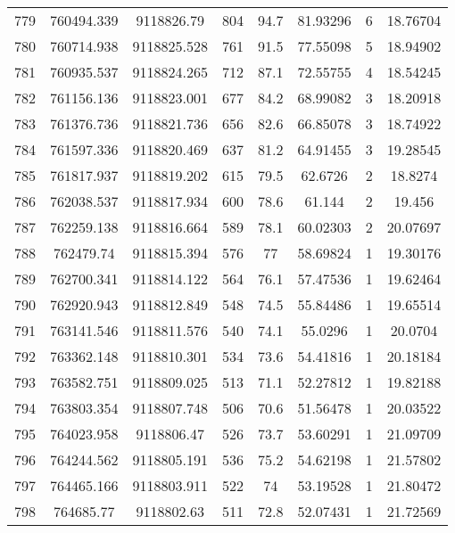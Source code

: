\begin{longtable}{cccccccc}
779  & 760494.339      & 9118826.79       & 804     & 94.7  & 81.93296 & 6  & 18.76704 \\
780  & 760714.938      & 9118825.528      & 761     & 91.5  & 77.55098 & 5  & 18.94902 \\
781  & 760935.537      & 9118824.265      & 712     & 87.1  & 72.55755 & 4  & 18.54245 \\
782  & 761156.136      & 9118823.001      & 677     & 84.2  & 68.99082 & 3  & 18.20918 \\
783  & 761376.736      & 9118821.736      & 656     & 82.6  & 66.85078 & 3  & 18.74922 \\
784  & 761597.336      & 9118820.469      & 637     & 81.2  & 64.91455 & 3  & 19.28545 \\
785  & 761817.937      & 9118819.202      & 615     & 79.5  & 62.6726  & 2  & 18.8274  \\
786  & 762038.537      & 9118817.934      & 600     & 78.6  & 61.144   & 2  & 19.456   \\
787  & 762259.138      & 9118816.664      & 589     & 78.1  & 60.02303 & 2  & 20.07697 \\
788  & 762479.74       & 9118815.394      & 576     & 77    & 58.69824 & 1  & 19.30176 \\
789  & 762700.341      & 9118814.122      & 564     & 76.1  & 57.47536 & 1  & 19.62464 \\
790  & 762920.943      & 9118812.849      & 548     & 74.5  & 55.84486 & 1  & 19.65514 \\
791  & 763141.546      & 9118811.576      & 540     & 74.1  & 55.0296  & 1  & 20.0704  \\
792  & 763362.148      & 9118810.301      & 534     & 73.6  & 54.41816 & 1  & 20.18184 \\
793  & 763582.751      & 9118809.025      & 513     & 71.1  & 52.27812 & 1  & 19.82188 \\
794  & 763803.354      & 9118807.748      & 506     & 70.6  & 51.56478 & 1  & 20.03522 \\
795  & 764023.958      & 9118806.47       & 526     & 73.7  & 53.60291 & 1  & 21.09709 \\
796  & 764244.562      & 9118805.191      & 536     & 75.2  & 54.62198 & 1  & 21.57802 \\
797  & 764465.166      & 9118803.911      & 522     & 74    & 53.19528 & 1  & 21.80472 \\
798  & 764685.77       & 9118802.63       & 511     & 72.8  & 52.07431 & 1  & 21.72569 \\

\end{longtable}
